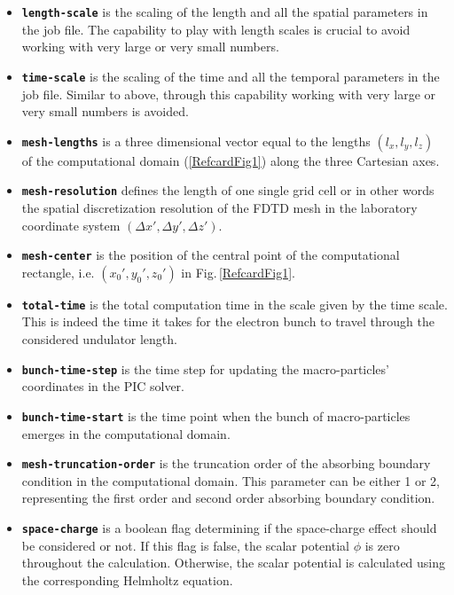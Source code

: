 \begin{itemize}
\item \textbf{\texttt{length-scale}} is the scaling of the length and all the spatial parameters in the job file. The capability to play with length scales is crucial to avoid working with very large or very small numbers.
\item \textbf{\texttt{time-scale}} is the scaling of the time and all the temporal parameters in the job file. Similar to above, through this capability working with very large or very small numbers is avoided.
\item \textbf{\texttt{mesh-lengths}} is a three dimensional vector equal to the lengths $(l_x,l_y,l_z)$ of the computational domain (\ref{RefcardFig1}) along the three Cartesian axes.
\item \textbf{\texttt{mesh-resolution}} defines the length of one single grid cell or in other words the spatial discretization resolution of the FDTD mesh in the laboratory coordinate system $(\Delta x',\Delta y',\Delta z')$.
\item \textbf{\texttt{mesh-center}} is the position of the central point of the computational rectangle, i.e. $(x_0',y_0',z_0')$ in Fig.\,\ref{RefcardFig1}.
\item \textbf{\texttt{total-time}} is the total computation time in the scale given by the time scale. This is indeed the time it takes for the electron bunch to travel through the considered undulator length.
\item \textbf{\texttt{bunch-time-step}} is the time step for updating the macro-particles' coordinates in the PIC solver.
\item \textbf{\texttt{bunch-time-start}} is the time point when the bunch of macro-particles emerges in the computational domain.
\item \textbf{\texttt{mesh-truncation-order}} is the truncation order of the absorbing boundary condition in the computational domain. This parameter can be either 1 or 2, representing the first order and second order absorbing boundary condition.
\item \textbf{\texttt{space-charge}} is a boolean flag determining if the space-charge effect should be considered or not. If this flag is false, the scalar potential $\phi$ is zero throughout the calculation. Otherwise, the scalar potential is calculated using the corresponding Helmholtz equation.
\end{itemize}

